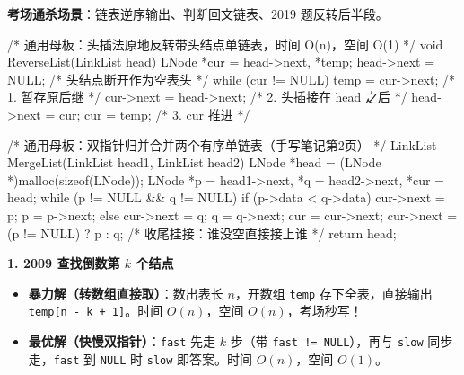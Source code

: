 \documentclass[10pt,a4paper]{ctexart}
\begin{document}

\textbf{考场通杀场景}：链表逆序输出、判断回文链表、2019 题反转后半段。

\begin{codebox}
/* 通用母板：头插法原地反转带头结点单链表，时间 O(n)，空间 O(1) */
void ReverseList(LinkList head) {
    LNode *cur = head->next, *temp;
    head->next = NULL;                  /* 头结点断开作为空表头 */
    while (cur != NULL) {
        temp = cur->next;               /* 1. 暂存原后继 */
        cur->next = head->next;         /* 2. 头插接在 head 之后 */
        head->next = cur;
        cur = temp;                     /* 3. cur 推进 */
    }
}
\end{codebox}

\par\addvspace{3pt}\par\addvspace{3pt}


\begin{codebox}
/* 通用母板：双指针归并合并两个有序单链表（手写笔记第2页） */
LinkList MergeList(LinkList head1, LinkList head2) {
    LNode *head = (LNode *)malloc(sizeof(LNode));
    LNode *p = head1->next, *q = head2->next, *cur = head;
    while (p != NULL && q != NULL) {
        if (p->data < q->data) { cur->next = p; p = p->next; }
        else { cur->next = q; q = q->next; }
        cur = cur->next;
    }
    cur->next = (p != NULL) ? p : q;    /* 收尾挂接：谁没空直接接上谁 */
    return head;
}
\end{codebox}

\par\addvspace{3pt}\par\addvspace{3pt}


\par\addvspace{2pt}\noindent\textbf{1. 2009 查找倒数第 $k$ 个结点}\par

\begin{itemize}

\item \textbf{暴力解（转数组直接取）}：数出表长 $n$，开数组 \texttt{temp} 存下全表，直接输出 \texttt{temp[n - k + 1]}。时间 $O(n)$，空间 $O(n)$，考场秒写！

\item \textbf{最优解（快慢双指针）}：\texttt{fast} 先走 $k$ 步（带 \texttt{fast != NULL}），再与 \texttt{slow} 同步走，\texttt{fast} 到 \texttt{NULL} 时 \texttt{slow} 即答案。时间 $O(n)$，空间 $O(1)$。

\end{itemize}
\end{document}
